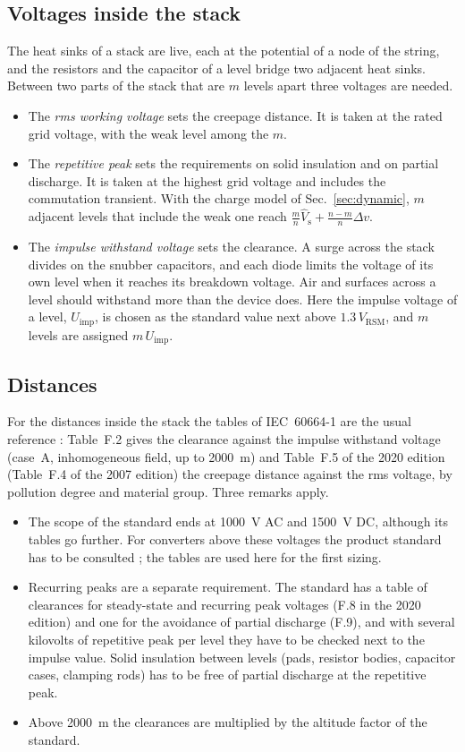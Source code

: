 \documentclass[10pt,a4paper]{scrartcl}
\newcommand{\Vrsm}{V_\mathrm{RSM}}
\newcommand{\Vs}{\hat V_\mathrm{s}}
\begin{document}
\subsection{Voltages inside the stack}
The heat sinks of a stack are live, each at the potential of a node of the string, and the resistors and the capacitor of a level bridge two adjacent heat sinks. Between two parts of the stack that are $m$ levels apart three voltages are needed.
\begin{itemize}
\item The \emph{rms working voltage} sets the creepage distance. It is taken at the rated grid voltage, with the weak level among the $m$.
\item The \emph{repetitive peak} sets the requirements on solid insulation and on partial discharge. It is taken at the highest grid voltage and includes the commutation transient. With the charge model of Sec.~\ref{sec:dynamic}, $m$ adjacent levels that include the weak one reach $\tfrac{m}{n}\Vs + \tfrac{n-m}{n}\Delta v$.
\item The \emph{impulse withstand voltage} sets the clearance. A surge across the stack divides on the snubber capacitors, and each diode limits the voltage of its own level when it reaches its breakdown voltage. Air and surfaces across a level should withstand more than the device does. Here the impulse voltage of a level, $U_\mathrm{imp}$, is chosen as the standard value next above $1.3\,\Vrsm$, and $m$ levels are assigned $m\,U_\mathrm{imp}$.
\end{itemize}

\subsection{Distances}
For the distances inside the stack the tables of IEC~60664-1 are the usual reference \cite{iec60664}: Table~F.2 gives the clearance against the impulse withstand voltage (case~A, inhomogeneous field, up to \SI{2000}{\metre}) and Table~F.5 of the 2020 edition (Table~F.4 of the 2007 edition) the creepage distance against the rms voltage, by pollution degree and material group. Three remarks apply.
\begin{itemize}
\item The scope of the standard ends at \SI{1000}{\volt} AC and \SI{1500}{\volt} DC, although its tables go further. For converters above these voltages the product standard has to be consulted \cite{iec62477}; the tables are used here for the first sizing.
\item Recurring peaks are a separate requirement. The standard has a table of clearances for steady-state and recurring peak voltages (F.8 in the 2020 edition) and one for the avoidance of partial discharge (F.9), and with several kilovolts of repetitive peak per level they have to be checked next to the impulse value. Solid insulation between levels (pads, resistor bodies, capacitor cases, clamping rods) has to be free of partial discharge at the repetitive peak.
\item Above \SI{2000}{\metre} the clearances are multiplied by the altitude factor of the standard.
\end{itemize}
\end{document}
